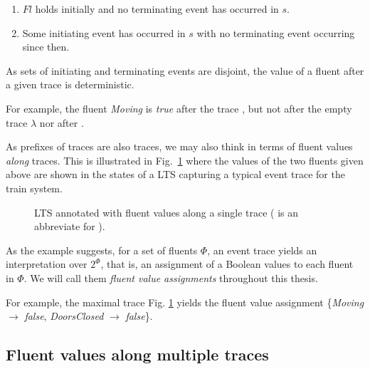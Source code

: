 \begin{enumerate}
\item $Fl$ holds initially and no terminating event has occurred in $s$.
\item Some initiating event has occurred in $s$ with no terminating event occurring since then.
\end{enumerate}

As sets of initiating and terminating events are disjoint, the value of a fluent after a given trace is deterministic. 

For example, the fluent \emph{Moving} is \emph{true} after the trace , but not after the empty trace $\lambda$ nor after . 

As prefixes of traces are also traces, we may also think in terms of fluent values \emph{along} traces. This is illustrated in Fig.~\ref{image:fluent-values-along-a-trace} where the values of the two fluents given above are shown in the states of a LTS capturing a typical event trace for the train system. 

\begin{figure}[H]\centering
{}
\caption{LTS annotated with fluent values along a single trace ( is an abbreviate for ).\label{image:fluent-values-along-a-trace}}
\end{figure}

As the example suggests, for a set of fluents $\Phi$, an event trace yields an interpretation over $2^\Phi$, that is, an assignment of a Boolean values to each fluent in $\Phi$. We will call them \emph{fluent value assignments} throughout this thesis. 

For example, the maximal trace Fig. \ref{image:fluent-values-along-a-trace} yields the fluent value assignment \{\emph{Moving} $\rightarrow$ \emph{false}, \emph{DoorsClosed} $\rightarrow$ \emph{false}\}. 

\subsection{Fluent values along multiple traces}

